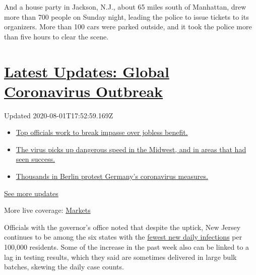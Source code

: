 And a house party in Jackson, N.J., about 65 miles south of Manhattan,
drew more than 700 people on Sunday night, leading the police to issue
tickets to its organizers. More than 100 cars were parked outside, and
it took the police more than five hours to clear the scene.

\hypertarget{latest-updates-global-coronavirus-outbreak}{%
\section{\texorpdfstring{\href{https://www.nytimes.com/2020/08/01/world/coronavirus-covid-19.html?action=click\&pgtype=Article\&state=default\&region=MAIN_CONTENT_1\&context=storylines_live_updates}{Latest
Updates: Global Coronavirus
Outbreak}}{Latest Updates: Global Coronavirus Outbreak}}\label{latest-updates-global-coronavirus-outbreak}}

Updated 2020-08-01T17:52:59.169Z

\begin{itemize}
\tightlist
\item
  \href{https://www.nytimes.com/2020/08/01/world/coronavirus-covid-19.html?action=click\&pgtype=Article\&state=default\&region=MAIN_CONTENT_1\&context=storylines_live_updates\#link-3ac56579}{Top
  officials work to break impasse over jobless benefit.}
\item
  \href{https://www.nytimes.com/2020/08/01/world/coronavirus-covid-19.html?action=click\&pgtype=Article\&state=default\&region=MAIN_CONTENT_1\&context=storylines_live_updates\#link-8796723}{The
  virus picks up dangerous speed in the Midwest, and in areas that had
  seen success.}
\item
  \href{https://www.nytimes.com/2020/08/01/world/coronavirus-covid-19.html?action=click\&pgtype=Article\&state=default\&region=MAIN_CONTENT_1\&context=storylines_live_updates\#link-25930521}{Thousands
  in Berlin protest Germany's coronavirus measures.}
\end{itemize}

\href{https://www.nytimes.com/2020/08/01/world/coronavirus-covid-19.html?action=click\&pgtype=Article\&state=default\&region=MAIN_CONTENT_1\&context=storylines_live_updates}{See
more updates}

More live coverage:
\href{https://www.nytimes.com/live/2020/07/31/business/stock-market-today-coronavirus?action=click\&pgtype=Article\&state=default\&region=MAIN_CONTENT_1\&context=storylines_live_updates}{Markets}

Officials with the governor's office noted that despite the uptick, New
Jersey continues to be among the six states with the
\href{https://www.nytimes.com/interactive/2020/us/coronavirus-us-cases.html\#states}{fewest
new daily infections} per 100,000 residents. Some of the increase in the
past week also can be linked to a lag in testing results, which they
said are sometimes delivered in large bulk batches, skewing the daily
case counts.


